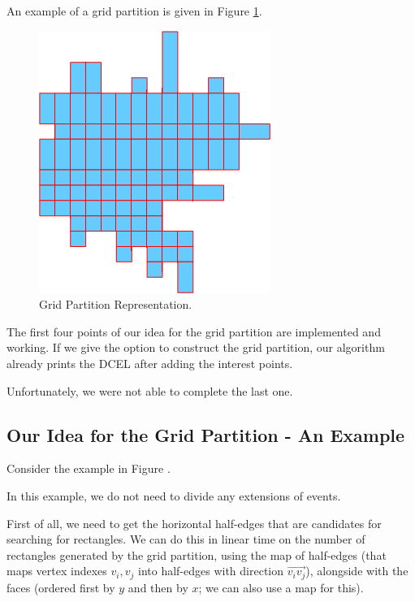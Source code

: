 \documentclass[12pt,a4paper,oneside]{article}
\begin{document}
An example of a grid partition is given in Figure \ref{fig:grid}.

\begin{figure}[h!]
  \centering \includegraphics[scale=0.5]{gridPartition.png}
  \caption{Grid Partition Representation.}
  \label{fig:grid}
\end{figure}

The first four points of our idea for the grid partition are implemented and working. If we give the option to construct the grid partition, our algorithm already prints the DCEL after adding the interest points.

Unfortunately, we were not able to complete the last one.

\subsection{Our Idea for the Grid Partition - An Example}\label{subsec:gridex}

Consider the example in Figure . %


In this example, we do not need to divide any extensions of events.

First of all, we need to get the horizontal half-edges that are candidates for searching for rectangles. We can do this in linear time on the number of rectangles generated by the grid partition, using the map of half-edges (that maps vertex indexes $v_{i}, v_{j}$ into half-edges with direction $\overrightarrow{v_{i} v_{j}}$), alongside with the faces (ordered first by $y$ and then by $x$; we can also use a map for this).
\end{document}

